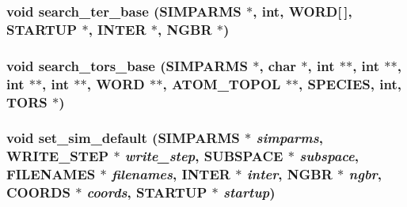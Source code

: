\subsubsection{\setlength{\rightskip}{0pt plus 5cm}void search\_\-ter\_\-base ({\bf SIMPARMS} $\ast$, int, {\bf WORD}[$\,$], {\bf STARTUP} $\ast$, {\bf INTER} $\ast$, {\bf NGBR} $\ast$)}\label{thomas_2proto__input_8h_f847a1490feeb84ae5142f9cc784f074}


\subsubsection{\setlength{\rightskip}{0pt plus 5cm}void search\_\-tors\_\-base ({\bf SIMPARMS} $\ast$, char $\ast$, int $\ast$$\ast$, int $\ast$$\ast$, int $\ast$$\ast$, int $\ast$$\ast$, {\bf WORD} $\ast$$\ast$, {\bf ATOM\_\-TOPOL} $\ast$$\ast$, {\bf SPECIES}, int, {\bf TORS} $\ast$)}\label{thomas_2proto__input_8h_fe74b6c6f05f1970facefff17a412f48}


\subsubsection{\setlength{\rightskip}{0pt plus 5cm}void set\_\-sim\_\-default ({\bf SIMPARMS} $\ast$ {\em simparms}, {\bf WRITE\_\-STEP} $\ast$ {\em write\_\-step}, {\bf SUBSPACE} $\ast$ {\em subspace}, {\bf FILENAMES} $\ast$ {\em filenames}, {\bf INTER} $\ast$ {\em inter}, {\bf NGBR} $\ast$ {\em ngbr}, {\bf COORDS} $\ast$ {\em coords}, {\bf STARTUP} $\ast$ {\em startup})}\label{thomas_2proto__input_8h_d777c0223db2b66ed56581a0dccb8723}


